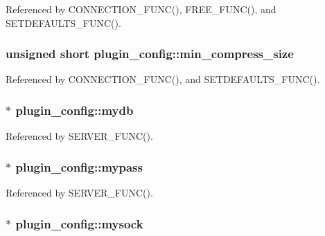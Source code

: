 Referenced by C\-O\-N\-N\-E\-C\-T\-I\-O\-N\-\_\-\-F\-U\-N\-C(), F\-R\-E\-E\-\_\-\-F\-U\-N\-C(), and S\-E\-T\-D\-E\-F\-A\-U\-L\-T\-S\-\_\-\-F\-U\-N\-C().

\hypertarget{structplugin__config_a0b8e331453deca106e79afb2e96e75a1}{
\subsubsection[{min\-\_\-compress\-\_\-size}]{\setlength{\rightskip}{0pt plus 5cm}unsigned short plugin\-\_\-config\-::min\-\_\-compress\-\_\-size}}\label{structplugin__config_a0b8e331453deca106e79afb2e96e75a1}


Referenced by C\-O\-N\-N\-E\-C\-T\-I\-O\-N\-\_\-\-F\-U\-N\-C(), and S\-E\-T\-D\-E\-F\-A\-U\-L\-T\-S\-\_\-\-F\-U\-N\-C().

\hypertarget{structplugin__config_ae62715a55c790ec56a02c717d75905af}{
\subsubsection[{mydb}]{$\ast$ plugin\-\_\-config\-::mydb}}\label{structplugin__config_ae62715a55c790ec56a02c717d75905af}


Referenced by S\-E\-R\-V\-E\-R\-\_\-\-F\-U\-N\-C().

\hypertarget{structplugin__config_a79f070d7ccce5607a7b48e4c3c042f5d}{
\subsubsection[{mypass}]{$\ast$ plugin\-\_\-config\-::mypass}}\label{structplugin__config_a79f070d7ccce5607a7b48e4c3c042f5d}


Referenced by S\-E\-R\-V\-E\-R\-\_\-\-F\-U\-N\-C().

\hypertarget{structplugin__config_a99fa88ceb957d89b640d1143fdcaec63}{
\subsubsection[{mysock}]{$\ast$ plugin\-\_\-config\-::mysock}}\label{structplugin__config_a99fa88ceb957d89b640d1143fdcaec63}


